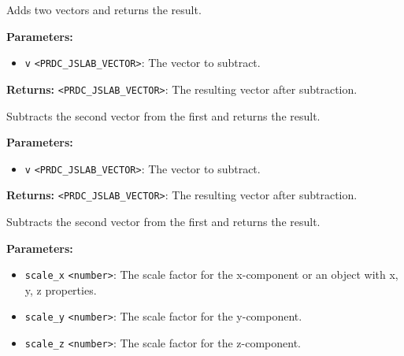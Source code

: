 \documentclass[12pt,a4paper]{article}
\begin{document}
\noindent Adds two vectors and returns the result.

\vspace{5mm}
\noindent {}


\noindent \textbf{Parameters:}
\begin{itemize}
  \item \texttt{v} \texttt{<PRDC\_JSLAB\_VECTOR>}: The vector to subtract.
\end{itemize}

\noindent \textbf{Returns:} \texttt{<PRDC\_JSLAB\_VECTOR>}: The resulting vector after subtraction.

\noindent Subtracts the second vector from the first and returns the result.

\vspace{5mm}
\noindent {}


\noindent \textbf{Parameters:}
\begin{itemize}
  \item \texttt{v} \texttt{<PRDC\_JSLAB\_VECTOR>}: The vector to subtract.
\end{itemize}

\noindent \textbf{Returns:} \texttt{<PRDC\_JSLAB\_VECTOR>}: The resulting vector after subtraction.

\noindent Subtracts the second vector from the first and returns the result.

\vspace{5mm}
\noindent {}


\noindent \textbf{Parameters:}
\begin{itemize}
  \item \texttt{scale\_x} \texttt{<number>}: The scale factor for the x-component or an object with x, y, z properties.
  \item \texttt{scale\_y} \texttt{<number>}: The scale factor for the y-component.
  \item \texttt{scale\_z} \texttt{<number>}: The scale factor for the z-component.
\end{itemize}
\end{document}
